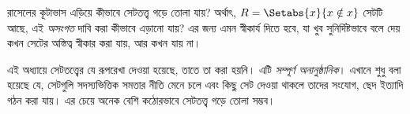 \documentclass[../../../include/open-logic-section]{subfiles}
\begin{document}
\begin{digress}
রাসেলের কূটাভাস এড়িয়ে কীভাবে সেটতত্ত্ব গড়ে তোলা যায়? অর্থাৎ,
$R = \Setabs{x}{x \notin x}$ সেটটি আছে, এই \emph{অসংগত} দাবি করা
কীভাবে এড়ানো যায়? এর জন্য এমন স্বীকার্য দিতে হবে, যা খুব সুনির্দিষ্টভাবে
বলে দেয় কখন সেটের অস্তিত্ব স্বীকার করা যায়, আর কখন যায় না।

এই অধ্যায়ে সেটতত্ত্বের যে রূপরেখা দেওয়া হয়েছে, তাতে তা করা হয়নি।
এটি \emph{সম্পূর্ণ অনানুষ্ঠানিক}। এখানে শুধু বলা হয়েছে যে, সেটগুলি
সদস্যভিত্তিক সমতার নীতি মেনে চলে এবং কিছু সেট দেওয়া থাকলে তাদের
সংযোগ, ছেদ ইত্যাদি গঠন করা যায়। এর চেয়ে অনেক বেশি কঠোরভাবে
সেটতত্ত্ব গড়ে তোলা সম্ভব। 
\end{digress}
\end{document}
